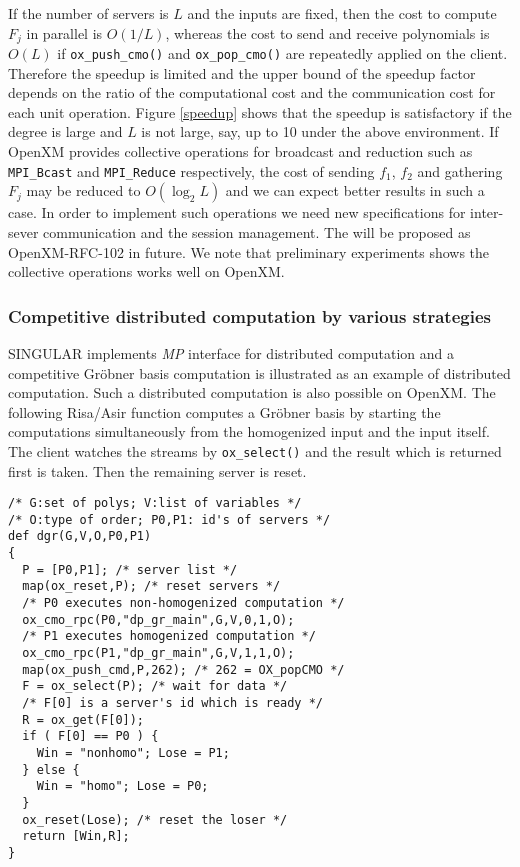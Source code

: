 If the number of servers is $L$ and the inputs are fixed, then the cost to
compute $F_j$ in parallel is $O(1/L)$, whereas the cost
to send and receive polynomials is $O(L)$ if {\tt ox\_push\_cmo()} and
{\tt ox\_pop\_cmo()} are repeatedly applied on the client.
Therefore the speedup is limited and the upper bound of
the speedup factor depends on the ratio of 
the computational cost and the communication cost for each unit operation.
Figure \ref{speedup} shows that 
the speedup is satisfactory if the degree is large and $L$
is not large, say, up to 10 under the above environment.
If OpenXM provides collective operations for broadcast and reduction
such as {\tt MPI\_Bcast} and {\tt MPI\_Reduce} respectively, the cost of 
sending $f_1$, $f_2$ and gathering $F_j$ may be reduced to $O(\log_2L)$
and we can expect better results in such a case. In order to implement
such operations we need new specifications for inter-sever communication
and the session management. The will be proposed as OpenXM-RFC-102 in future.
We note that preliminary experiments shows the collective operations
works well on OpenXM.

\subsubsection{Competitive distributed computation by various strategies}

SINGULAR \cite{Singular} implements {\it MP} interface for distributed
computation and a competitive Gr\"obner basis computation is
illustrated as an example of distributed computation.
Such a distributed computation is also possible on OpenXM.
The following Risa/Asir function computes a Gr\"obner basis by
starting the computations simultaneously from the homogenized input and
the input itself.  The client watches the streams by {\tt ox\_select()}
and the result which is returned first is taken. Then the remaining
server is reset.

\begin{verbatim}
/* G:set of polys; V:list of variables */
/* O:type of order; P0,P1: id's of servers */
def dgr(G,V,O,P0,P1)
{
  P = [P0,P1]; /* server list */
  map(ox_reset,P); /* reset servers */
  /* P0 executes non-homogenized computation */
  ox_cmo_rpc(P0,"dp_gr_main",G,V,0,1,O);
  /* P1 executes homogenized computation */
  ox_cmo_rpc(P1,"dp_gr_main",G,V,1,1,O);
  map(ox_push_cmd,P,262); /* 262 = OX_popCMO */
  F = ox_select(P); /* wait for data */
  /* F[0] is a server's id which is ready */
  R = ox_get(F[0]);
  if ( F[0] == P0 ) {
    Win = "nonhomo"; Lose = P1;
  } else {
    Win = "homo"; Lose = P0;
  }
  ox_reset(Lose); /* reset the loser */
  return [Win,R];
}
\end{verbatim}

